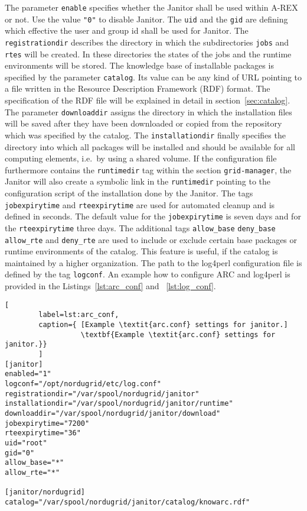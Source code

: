 The parameter \texttt{enable} specifies whether the Janitor shall be used within A-REX or not. Use the value \texttt{"0"} to disable Janitor. The
\texttt{uid} and the \texttt{gid} are defining which effective the user and group id shall be used for Janitor. 
The \texttt{registrationdir} describes the directory in which the subdirectories \texttt{jobs} and \texttt{rtes} will be created.
In these directories the states of the jobs and the runtime environments will be stored. 
The knowledge base of installable packages is specified by the parameter \texttt{catalog}. 
Its value can be any kind of URL pointing to a file written in the Resource Description Framework (RDF) format.
The specification of the RDF file will be explained in detail in section~\ref{sec:catalog}.
The parameter \texttt{downloaddir} assigns the directory in which the installation files will be saved after they have been 
downloaded or copied from the repository which was specified by the catalog. The \texttt{installationdir} finally specifies the
directory into which all packages will be installed and should be 
available for all computing elements, i.e.\ by using a shared volume.
If the configuration file furthermore contains the \texttt{runtimedir} tag within the section \texttt{grid-manager}, the Janitor will also
create a symbolic link in the \texttt{runtimedir} pointing to the configuration script of the installation done by the Janitor.
The tags \texttt{jobexpirytime} and \texttt{rteexpirytime} are used for automated cleanup and is defined in seconds.
The default value for the \texttt{jobexpirytime} is seven days and for the \texttt{rteexpirytime} three days. 
The additional tags \texttt{allow\_base} \texttt{deny\_base} \texttt{allow\_rte} and \texttt{deny\_rte} are used to include
or exclude certain base packages or runtime environments of the catalog. This feature is useful, if the catalog is maintained by
a higher organization.
The path to the log4perl configuration file is defined by the tag \texttt{logconf}.
An example how to configure ARC and log4perl is provided in the Listings~\ref{lst:arc_conf} and ~\ref{lst:log_conf}.

\begin{lstlisting}[
        label=lst:arc_conf,
        caption={ [Example \textit{arc.conf} settings for janitor.]
                  \textbf{Example \textit{arc.conf} settings for janitor.}}
        ]
[janitor]
enabled="1"
logconf="/opt/nordugrid/etc/log.conf"
registrationdir="/var/spool/nordugrid/janitor"
installationdir="/var/spool/nordugrid/janitor/runtime"
downloaddir="/var/spool/nordugrid/janitor/download"
jobexpirytime="7200"
rteexpirytime="36"
uid="root"
gid="0"
allow_base="*"
allow_rte="*"

[janitor/nordugrid]
catalog="/var/spool/nordugrid/janitor/catalog/knowarc.rdf"
\end{lstlisting}

